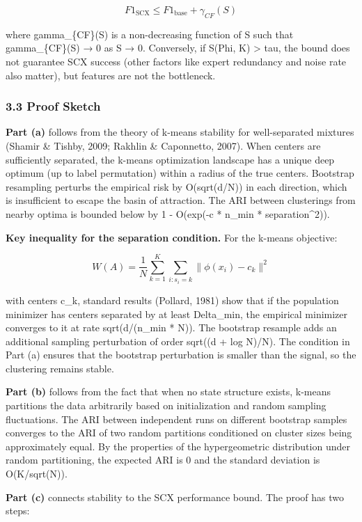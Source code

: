 \documentclass[
  12pt,
]{ctexart}
\begin{document}
\[F1_{\text{SCX}} \leq F1_{\text{base}} + \gamma_{CF}(S)\]

where gamma\_\{CF\}(S) is a non-decreasing function of S such that
gamma\_\{CF\}(S) → 0 as S → 0. Conversely, if S(Phi, K) \textgreater{}
tau, the bound does not guarantee SCX success (other factors like expert
redundancy and noise rate also matter), but features are not the
bottleneck.

\subsubsection{3.3 Proof Sketch}\label{proof-sketch}

\textbf{Part (a)} follows from the theory of k-means stability for
well-separated mixtures (Shamir \& Tishby, 2009; Rakhlin \& Caponnetto,
2007). When centers are sufficiently separated, the k-means optimization
landscape has a unique deep optimum (up to label permutation) within a
radius of the true centers. Bootstrap resampling perturbs the empirical
risk by O(sqrt(d/N)) in each direction, which is insufficient to escape
the basin of attraction. The ARI between clusterings from nearby optima
is bounded below by 1 - O(exp(-c * n\_min * separation\^{}2)).

\textbf{Key inequality for the separation condition.} For the k-means
objective:

\[W(A) = \frac{1}{N} \sum_{k=1}^K \sum_{i: s_i = k} \|\phi(x_i) - c_k\|^2\]

with centers c\_k, standard results (Pollard, 1981) show that if the
population minimizer has centers separated by at least Delta\_min, the
empirical minimizer converges to it at rate sqrt(d/(n\_min * N)). The
bootstrap resample adds an additional sampling perturbation of order
sqrt((d + log N)/N). The condition in Part (a) ensures that the
bootstrap perturbation is smaller than the signal, so the clustering
remains stable.

\textbf{Part (b)} follows from the fact that when no state structure
exists, k-means partitions the data arbitrarily based on initialization
and random sampling fluctuations. The ARI between independent runs on
different bootstrap samples converges to the ARI of two random
partitions conditioned on cluster sizes being approximately equal. By
the properties of the hypergeometric distribution under random
partitioning, the expected ARI is 0 and the standard deviation is
O(K/sqrt(N)).

\textbf{Part (c)} connects stability to the SCX performance bound. The
proof has two steps:
\end{document}
